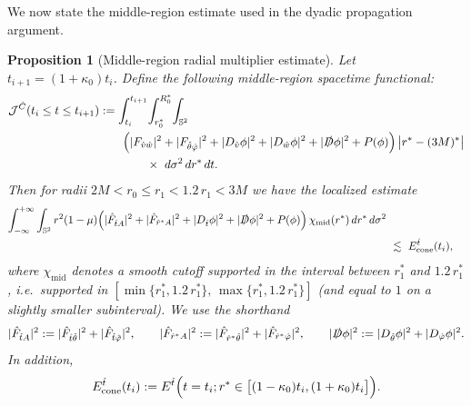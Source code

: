 \documentclass[11pt]{article}
\numberwithin{equation}{section}
\theoremstyle{plain}
\newtheorem{proposition}[theorem]{Proposition}
\theoremstyle{definition}
\theoremstyle{remark}
\begin{document}
We now state the middle-region estimate used in the dyadic propagation argument.
\begin{proposition}[Middle-region radial multiplier estimate]\label{prep5}
Let $t_{i+1}=(1+\kappa_0)t_i$.
Define the following middle-region spacetime functional:
\begin{eqnarray}\label{JC}
\mathcal{J}^{\hat C}(t_i\le t\le t_{i+1})
&:=
\int_{t_i}^{t_{i+1}}\!\int_{r_0^{\ast}}^{R_0^{\ast}}\!\int_{\mathbb S^{2}}
\\
&\qquad
\Bigl(
|F_{\hat v\hat w}|^{2}
+|F_{\hat\theta\hat\varphi}|^{2}
+|D_{\hat v}\phi|^{2}
+|D_{\hat w}\phi|^{2}
	+|\slashed D\phi|^{2}
+P(\phi)
\Bigr)
\,\bigl|r^{\ast}-(3M)^{\ast}\bigr|
\\
&\qquad\qquad\times\ d\sigma^{2}\,dr^{\ast}\,dt.
\end{eqnarray}
Then for radii $2M<r_{0}\le r_{1}<1.2\,r_{1}<3M$ we have the localized estimate
\begin{eqnarray}\label{prepo5}
\int_{-\infty}^{+\infty}\int_{\mathbb S^{2}}
r^{2}(1-\mu)
\Bigl(
	|\hat F_{\hat t A}|^{2}
	+|\hat F_{\hat r^{\ast}A}|^{2}
	+|D_{\hat t}\phi|^{2}
	+|\slashed D\phi|^{2}
+P(\phi)
\Bigr)
\,\chi_{\mathrm{mid}}(r^{\ast})\,dr^{\ast}\,d\sigma^{2}
\\
&\ \lesssim\ E^{\hat t}_{\mathrm{cone}}(t_i),
\end{eqnarray}
where $\chi_{\mathrm{mid}}$ denotes a smooth cutoff supported in the interval between $r_1^{\ast}$ and $1.2\,r_1^{\ast}$, i.e.\ supported in $[\min\{r_1^{\ast},1.2\,r_1^{\ast}\},\,\max\{r_1^{\ast},1.2\,r_1^{\ast}\}]$ (and equal to $1$ on a slightly smaller subinterval).
We use the shorthand
\begin{equation}
|\hat F_{\hat t A}|^{2}:=|\hat F_{\hat t\hat\theta}|^{2}+|\hat F_{\hat t\hat\varphi}|^{2},
\qquad
|\hat F_{\hat r^{\ast}A}|^{2}:=|\hat F_{\hat r^{\ast}\hat\theta}|^{2}+|\hat F_{\hat r^{\ast}\hat\varphi}|^{2},
\qquad
|\slashed D\phi|^{2}:=|D_{\hat\theta}\phi|^{2}+|D_{\hat\varphi}\phi|^{2}.
\end{equation}
In addition,
\begin{equation}
E^{\hat t}_{\mathrm{cone}}(t_i)
:=
E^{\hat t}\Bigl(
 t=t_i;
 r^{\ast}\in\bigl[(1-\kappa_0)t_i,(1+\kappa_0)t_i\bigr]
\Bigr).
\end{equation}
\end{proposition}
\end{document}
